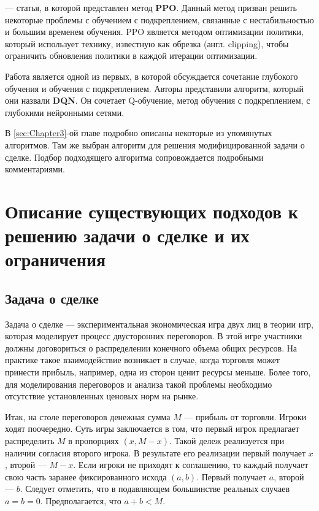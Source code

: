 \cite{schulman2017ppo} --- статья, в которой представлен метод \textbf{PPO}. Данный метод призван решить некоторые проблемы с обучением с подкреплением, связанные с нестабильностью и большим временем обучения. PPO является методом оптимизации политики, который использует технику, известную как обрезка (англ. clipping), чтобы ограничить обновления политики в каждой итерации оптимизации.

Работа \cite{mnih2013dqn} является одной из первых, в которой обсуждается сочетание глубокого обучения и обучения с подкреплением. Авторы представили алгоритм, который они назвали \textbf{DQN}. Он сочетает Q-обучение, метод обучения с подкреплением, с глубокими нейронными сетями.

В \ref{sec:Chapter3}-ой главе подробно описаны некоторые из упомянутых алгоритмов. Там же выбран алгоритм для решения модифицированной задачи о сделке. Подбор подходящего алгоритма сопровождается подробными комментариями.


\section{Описание существующих подходов к решению задачи о сделке и их ограничения}

\subsection{Задача о сделке}

Задача о сделке --- экспериментальная экономическая игра двух лиц в теории игр, которая моделирует процесс двусторонних переговоров. В этой игре участники должны договориться о распределении конечного объема общих ресурсов. На практике такое взаимодействие возникает в случае, когда торговля может принести прибыль, например, одна из сторон ценит ресурсы меньше. Более того, для моделирования переговоров и анализа такой проблемы необходимо отсутствие установленных ценовых норм на рынке.

Итак, на столе переговоров денежная сумма $M$ --- прибыль от торговли. Игроки ходят поочередно. Суть игры заключается в том, что первый игрок предлагает распределить $M$ в пропорциях $(x, M - x)$. Такой дележ реализуется при наличии согласия второго игрока. В результате его реализации первый получает $x$, второй --- $M - x$. Если игроки не приходят к соглашению, то каждый получает свою часть заранее фиксированного исхода $(a, b)$. Первый получает $a$, второй --- $b$. Следует отметить, что в подавляющем большинстве реальных случаев $a = b = 0$. Предполагается, что $a + b < M$.

